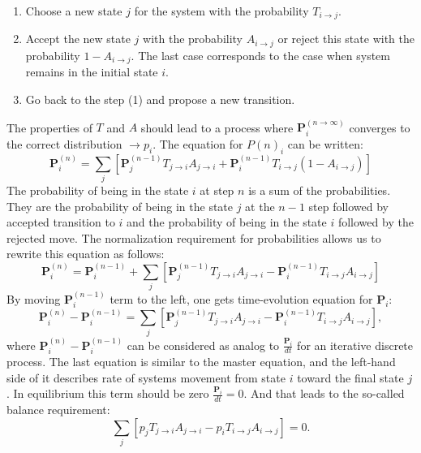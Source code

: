 \documentclass[twoside,english]{uiofysmaster}
\begin{document}
\begin{enumerate}
	\item Choose a new state $j$ for the system with the probability $T_{i\rightarrow j}$.
	\item Accept the new state $j$ with the probability $A_{i\rightarrow j}$ or reject this state with the probability $1-A_{i\rightarrow j}$. The last case corresponds to the case when system remains in the initial state $i$.
	\item Go back to the step (1) and propose a new transition.
\end{enumerate}
The properties of $T$ and $A$ should lead to a process where
$\mathbf{P}_i^{(n\rightarrow \infty)} $ converges to the correct
distribution $\rightarrow p_i$.  The equation for $ P(n)_i$ can be
written:
\begin{equation}
\mathbf{P}^{(n)}_i = \sum_j \left [
\mathbf{P}^{(n-1)}_jT_{j\rightarrow i} A_{j\rightarrow i} 
+\mathbf{P}^{(n-1)}_iT_{i\rightarrow j}\left ( 1- A_{i\rightarrow j} \right)
\right ]
\end{equation}
The probability of being in the state $i$ at step $n$ is a sum of the probabilities. They are the probability of being in the state $j$ at the $n-1$ step followed by accepted transition to $i$  and the probability of being in the state $i$ followed by the rejected move.
The normalization requirement for probabilities allows us to rewrite this equation as follows:
\begin{equation}
\mathbf{P}^{(n)}_i = \mathbf{P}^{(n-1)}_i +
\sum_j \left [
\mathbf{P}^{(n-1)}_jT_{j\rightarrow i} A_{j\rightarrow i} 
-\mathbf{P}^{(n-1)}_iT_{i\rightarrow j}A_{i\rightarrow j}
\right ] 
\end{equation}
By moving $\mathbf{P}^{(n-1)}_i$ term to the left, one gets time-evolution equation for $\mathbf{P}_i$:
\begin{equation}
\mathbf{P}^{(n)}_i - \mathbf{P}^{(n-1)}_i = 
\sum_j \left [
\mathbf{P}^{(n-1)}_jT_{j\rightarrow i} A_{j\rightarrow i} 
-\mathbf{P}^{(n-1)}_iT_{i\rightarrow j}A_{i\rightarrow j}
\right ] ,
\end{equation}
where $\mathbf{P}^{(n)}_i - \mathbf{P}^{(n-1)}_i$ can be considered as analog to $\frac {\mathbf{P}_i}{dt}$ for an iterative discrete process. The last equation is similar to the master equation, and the left-hand side of it describes rate of systems movement from state $i$ toward the final state $j$. In equilibrium this term should be zero $\frac {\mathbf{P}_i}{dt}=0$. And that leads to the so-called balance requirement: 
\begin{equation}
\sum_j \left [
p_jT_{j\rightarrow i} A_{j\rightarrow i}
-p_iT_{i\rightarrow j}A_{i\rightarrow j}
\right ] = 0 .
\end{equation}
\end{document}
